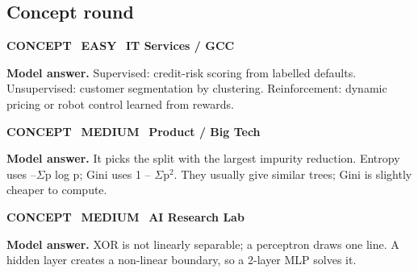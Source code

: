 \documentclass[11pt]{article}
\begin{document}
\subsection*{\color{teal}Concept round}
\begin{tcolorbox}[enhanced,breakable,colback=white,colframe=teal,arc=2mm,boxrule=0.8pt,left=3mm,right=3mm,
 title={\textbf{QV.01}\quad Explain supervised, unsupervised and reinforcement learning with one industry example each.},fonttitle=\color{white}\small,colbacktitle=teal]
\colorbox{teal!15}{\scriptsize\bfseries\color{teal} CONCEPT}\
\colorbox{leaf!15}{\scriptsize\bfseries\color{leaf} EASY}\
\colorbox{navy!8}{\scriptsize\bfseries\color{navy} IT Services / GCC}\par\smallskip
\textbf{\color{navy}Model answer.} Supervised: credit-risk scoring from labelled defaults. Unsupervised: customer segmentation by clustering. Reinforcement: dynamic pricing or robot control learned from rewards.
\end{tcolorbox}
\begin{tcolorbox}[enhanced,breakable,colback=white,colframe=teal,arc=2mm,boxrule=0.8pt,left=3mm,right=3mm,
 title={\textbf{QV.02}\quad How does a decision tree choose a split? Compare entropy and Gini.},fonttitle=\color{white}\small,colbacktitle=teal]
\colorbox{teal!15}{\scriptsize\bfseries\color{teal} CONCEPT}\
\colorbox{gold!85!black!15}{\scriptsize\bfseries\color{gold!85!black} MEDIUM}\
\colorbox{navy!8}{\scriptsize\bfseries\color{navy} Product / Big Tech}\par\smallskip
\textbf{\color{navy}Model answer.} It picks the split with the largest impurity reduction. Entropy uses --$\Sigma$p log p; Gini uses 1 -- $\Sigma$p$^2$. They usually give similar trees; Gini is slightly cheaper to compute.
\end{tcolorbox}
\begin{tcolorbox}[enhanced,breakable,colback=white,colframe=teal,arc=2mm,boxrule=0.8pt,left=3mm,right=3mm,
 title={\textbf{QV.03}\quad Why can't a single perceptron learn XOR?},fonttitle=\color{white}\small,colbacktitle=teal]
\colorbox{teal!15}{\scriptsize\bfseries\color{teal} CONCEPT}\
\colorbox{gold!85!black!15}{\scriptsize\bfseries\color{gold!85!black} MEDIUM}\
\colorbox{navy!8}{\scriptsize\bfseries\color{navy} AI Research Lab}\par\smallskip
\textbf{\color{navy}Model answer.} XOR is not linearly separable; a perceptron draws one line. A hidden layer creates a non-linear boundary, so a 2-layer MLP solves it.
\end{tcolorbox}
\end{document}
